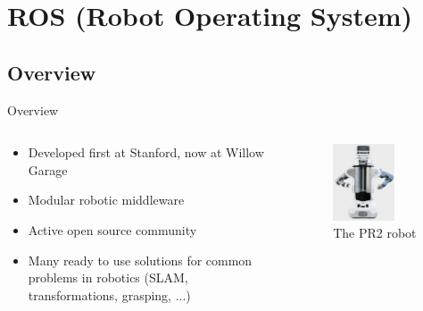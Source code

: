 \documentclass[compress]{beamer}
\begin{document}
\section{ROS (Robot Operating System)}

\subsection{Overview}
\begin{frame}{Overview}

\begin{columns}
\begin{column}{.6\textwidth}
\begin{itemize}
\item Developed first at Stanford, now at Willow Garage
\item Modular robotic middleware
\item Active open source community
\item Many ready to use solutions for common problems in robotics (SLAM, transformations, grasping, ...)
\end{itemize}
\end{column}%
\hfill%
\begin{column}{.48\textwidth}
\begin{figure}[t]
    \centering
    \includegraphics[width=0.7\textwidth]{images/pr2.png}
    \caption[The PR2 robot]{The PR2 robot}
\end{figure}
\end{column}%
\end{columns}
\end{frame}
\end{document}
